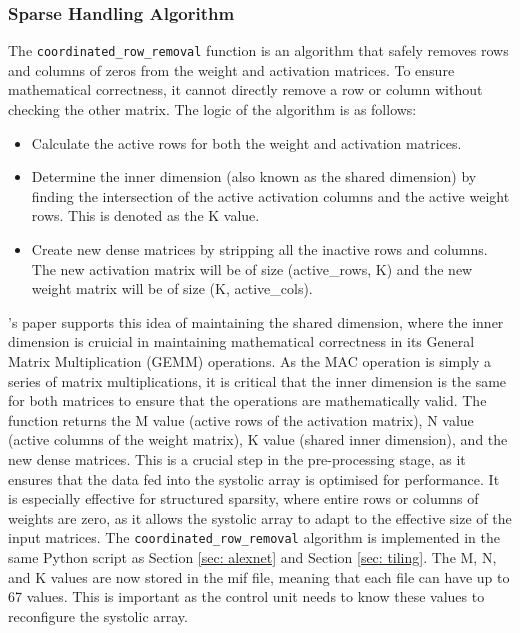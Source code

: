 \documentclass[12pt, a4paper, ukenglish]{article}
\begin{document}
    \subsubsection{Sparse Handling Algorithm}
    The \texttt{coordinated\_row\_removal} function is an algorithm that safely removes rows and columns of zeros from the weight and activation matrices. To ensure mathematical correctness, it cannot directly remove a row or column without checking the other matrix. The logic of the algorithm is as follows:
    \begin{itemize}
        \item Calculate the active rows for both the weight and activation matrices.
        \item Determine the inner dimension (also known as the shared dimension) by finding the intersection of the active activation columns and the active weight rows. This is denoted as the K value. 
        \item Create new dense matrices by stripping all the inactive rows and columns. The new activation matrix will be of size (active\_rows, K) and the new weight matrix will be of size (K, active\_cols).
    \end{itemize}
    \textcite{qin_sigma_2020}'s paper supports this idea of maintaining the shared dimension, where the inner dimension is cruicial in maintaining mathematical correctness in its General Matrix Multiplication (GEMM) operations. As the MAC operation is simply a series of matrix multiplications, it is critical that the inner dimension is the same for both matrices to ensure that the operations are mathematically valid.   
    The function returns the M value (active rows of the activation matrix), N value (active columns of the weight matrix), K value (shared inner dimension), and the new dense matrices. This is a crucial step in the pre-processing stage, as it ensures that the data fed into the systolic array is optimised for performance. It is especially effective for structured sparsity, where entire rows or columns of weights are zero, as it allows the systolic array to adapt to the effective size of the input matrices. 
    The \texttt{coordinated\_row\_removal} algorithm is implemented in the same Python script as Section \ref{sec: alexnet} and Section \ref{sec: tiling}. The M, N, and K values are now stored in the mif file, meaning that each file can have up to 67 values. This is important as the control unit needs to know these values to reconfigure the systolic array.
\end{document}
